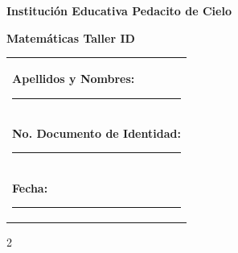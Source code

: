 ﻿\documentclass[10pt,a4paper]{article}
\makeatletter
\newcommand{\myID}{\@ID}
\newcommand{\myDate}{\@Date}
\makeatother
\begin{document}
\thispagestyle{empty}
{\sf
\textbf{\LARGE{Institución Educativa Pedacito de Cielo}}

\textbf{\large{Matemáticas \myDate \hfill Taller ID \myID}}

\vspace*{2cm}

\begin{tabular}{p{14cm}}
\textbf{Apellidos y Nombres:} \hrule \\[1.5cm]
\textbf{No. Documento de Identidad:} \hrule \\[1.5cm]
\textbf{Fecha:} \hrule \\[1.5cm]
\end{tabular}

\vspace*{1cm}

}
\newpage

\begin{multicols}{2}

\begin{enumerate}


\end{enumerate}

\end{multicols}
\end{document}
